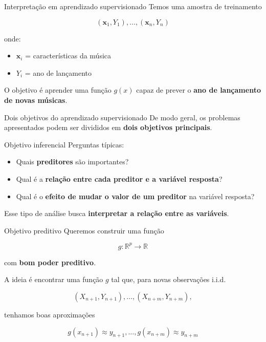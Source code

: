 \documentclass[
  ignorenonframetext,
  aspectratio=169,
]{beamer}
\providecommand{\tightlist}{%
  \setlength{\itemsep}{0pt}\setlength{\parskip}{0pt}}
\begin{document}
\begin{frame}
\begin{block}{Interpretação em aprendizado supervisionado}
\label{interpretauxe7uxe3o-em-aprendizado-supervisionado}
Temos uma amostra de treinamento

\[
(\mathbf{x}_1,Y_1),\ldots,(\mathbf{x}_n,Y_n)
\]

onde:

\begin{itemize}
\tightlist
\item
  \(\mathbf{x}_i\) = características da música
\item
  \(Y_i\) = ano de lançamento
\end{itemize}

O objetivo é aprender uma função \(g(x)\) capaz de prever o \textbf{ano
de lançamento de novas músicas}.
\end{block}
\end{frame}

\begin{frame}{Dois objetivos do aprendizado supervisionado}
\label{dois-objetivos-do-aprendizado-supervisionado}
De modo geral, os problemas apresentados podem ser divididos em
\textbf{dois objetivos principais}.

\begin{block}{Objetivo inferencial}
\label{objetivo-inferencial}
Perguntas típicas:

\begin{itemize}
\tightlist
\item
  Quais \textbf{preditores} são importantes?
\item
  Qual é a \textbf{relação entre cada preditor e a variável resposta}?
\item
  Qual é o \textbf{efeito de mudar o valor de um preditor} na variável
  resposta?
\end{itemize}

Esse tipo de análise busca \textbf{interpretar a relação entre as
variáveis}.
\end{block}
\end{frame}

\begin{frame}
\begin{block}{Objetivo preditivo}
\label{objetivo-preditivo}
Queremos construir uma função

\[
g : \mathbb{R}^p \rightarrow \mathbb{R}
\]

com \textbf{bom poder preditivo}.

A ideia é encontrar uma função \(g\) tal que, para novas observações
i.i.d.

\[
(X_{n+1},Y_{n+1}),\ldots,(X_{n+m},Y_{n+m}),
\]

tenhamos boas aproximações

\[
g(x_{n+1}) \approx y_{n+1}, \ldots, g(x_{n+m}) \approx y_{n+m}
\]
\end{block}
\end{frame}
\end{document}
